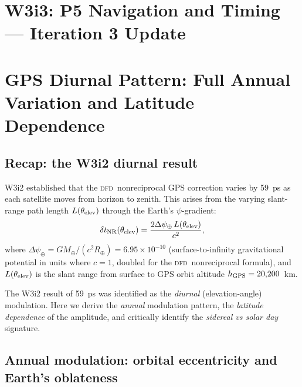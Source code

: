 \documentclass[aps,prd,twocolumn,superscriptaddress,nofootinbib,longbibliography]{revtex4-2}
\newcommand{\DFD}{\textsc{dfd}}
\begin{document}
\maketitle

\section*{W3i3: P5 Navigation and Timing --- Iteration 3 Update}

\section{GPS Diurnal Pattern: Full Annual Variation and Latitude Dependence}
\label{sec:gps-annual}

\subsection{Recap: the W3i2 diurnal result}

W3i2 established that the \DFD\ nonreciprocal GPS correction varies by
59~ps as each satellite moves from horizon to zenith.  This arises from
the varying slant-range path length $L(\theta_{\rm elev})$ through the
Earth's $\psi$-gradient:
\begin{equation}\label{eq:NR-GPS-slant}
\delta t_{\rm NR}(\theta_{\rm elev})
= \frac{2\Delta\psi_\oplus \, L(\theta_{\rm elev})}{c^2},
\end{equation}
where $\Delta\psi_\oplus = GM_\oplus/(c^2 R_\oplus) = 6.95\times10^{-10}$
(surface-to-infinity gravitational potential in units where $c=1$, doubled
for the \DFD\ nonreciprocal formula), and $L(\theta_{\rm elev})$ is the
slant range from surface to GPS orbit altitude $h_{\rm GPS} = 20{,}200$~km.

The W3i2 result of 59~ps was identified as the \emph{diurnal} (elevation-angle)
modulation.  Here we derive the \emph{annual} modulation pattern, the
\emph{latitude dependence} of the amplitude, and critically identify the
\emph{sidereal vs solar day} signature.

\subsection{Annual modulation: orbital eccentricity and Earth's oblateness}
\end{document}
